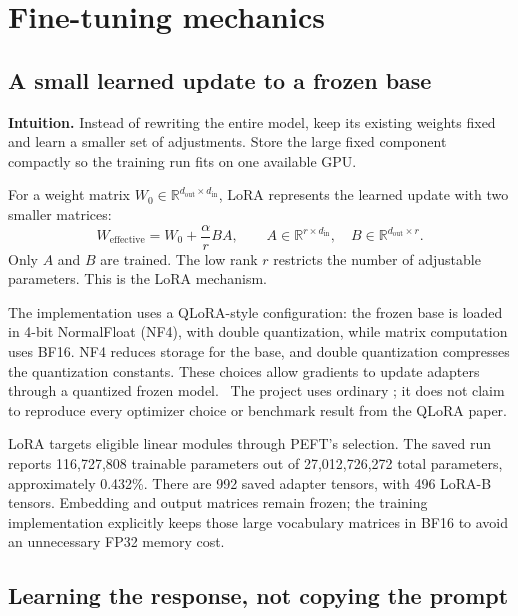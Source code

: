 \documentclass[11pt,a4paper]{article}
\newcommand{\code}[1]{\texttt{\detokenize{#1}}}
\newcommand{\intuition}[1]{\par\textbf{Intuition.} #1\par}
\begin{document}
\section{Fine-tuning mechanics}
\label{sec:training}

\subsection{A small learned update to a frozen base}

\intuition{Instead of rewriting the entire model, keep its existing weights
fixed and learn a smaller set of adjustments. Store the large fixed component
compactly so the training run fits on one available GPU.}

For a weight matrix $W_0\in\mathbb{R}^{d_{\mathrm{out}}\times d_{\mathrm{in}}}$,
LoRA represents the learned update with two smaller matrices:
\begin{equation}
W_{\mathrm{effective}}=W_0+\frac{\alpha}{r}BA,
\qquad
A\in\mathbb{R}^{r\times d_{\mathrm{in}}},\quad
B\in\mathbb{R}^{d_{\mathrm{out}}\times r}.
\end{equation}
Only $A$ and $B$ are trained. The low rank $r$ restricts the number of adjustable
parameters. This is the LoRA mechanism.~\cite{lora}

The implementation uses a QLoRA-style configuration: the frozen base is loaded
in 4-bit NormalFloat (NF4), with double quantization, while matrix computation
uses BF16. NF4 reduces storage for the base, and double quantization compresses
the quantization constants. These choices allow gradients to update adapters
through a quantized frozen model.~\cite{qlora} The project uses ordinary
\code{adamw_torch}; it does not claim to reproduce every optimizer choice or
benchmark result from the QLoRA paper.

LoRA targets eligible linear modules through PEFT's \code{all-linear} selection.
The saved run reports 116,727,808 trainable parameters out of 27,012,726,272 total
parameters, approximately 0.432\%. There are 992 saved adapter tensors, with
496 LoRA-B tensors. Embedding and output matrices remain frozen; the training
implementation explicitly keeps those large vocabulary matrices in BF16 to
avoid an unnecessary FP32 memory cost.

\subsection{Learning the response, not copying the prompt}
\end{document}
